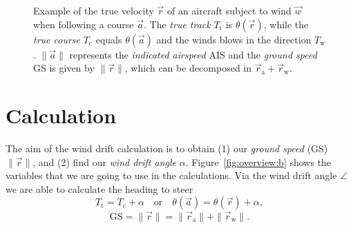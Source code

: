\documentclass[a4paper,10pt]{article}
\begin{document}
\begin{figure}
{     \centering
    \label{fig:overview:b}
    }%
\caption{Example of the true velocity $\vec{r}$ of an aircraft subject to wind $\vec{w}$ when following a course $\vec{a}$. The \emph{true track} $T_\mathrm{t}$ is $\theta(\vec{r})$, while the \emph{true course} $T_\mathrm{c}$ equals $\theta(\vec{a})$ and the winds blows in the direction $T_\mathrm{w}$. $\|\vec{a}\|$ represents the \emph{indicated airspeed} AIS and the \emph{ground speed} GS is given by $\|\vec{r}\|$, which can be decomposed in $\vec{r}_\mathrm{a} + \vec{r}_\mathrm{w}$.}
\label{fig:overview}
\end{figure}


\section{Calculation}

The aim of the wind drift calculation is to obtain (1) our \emph{ground speed} (GS) $\|\vec{r}\|$, and (2) find our \emph{wind drift angle} $\alpha$.
Figure~\ref{fig:overview:b} shows the variables that we are going to use in the calculations.
Via the wind drift angle $\angle$ we are able to calculate the heading to steer
\begin{equation}
 T_\mathrm{t}=T_\mathrm{c}+\alpha\quad\text{or}\quad\theta(\vec{a}) = \theta(\vec{r}) + \alpha,
\end{equation}
\begin{equation}
 \text{GS}= \|\vec{r}\| = \|\vec{r}_\mathrm{a}\| + \|\vec{r}_\mathrm{w}\|.
\end{equation}
\end{document}
